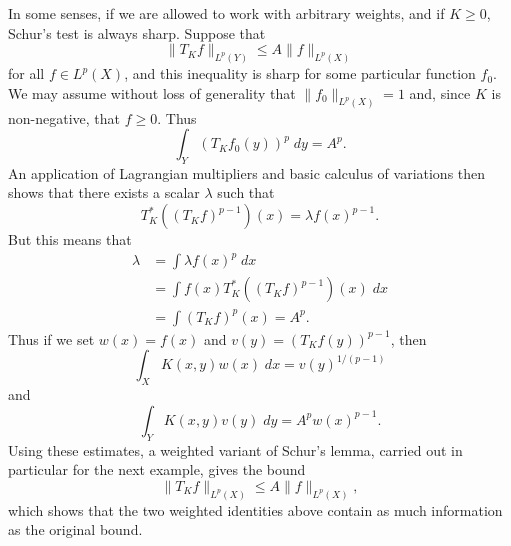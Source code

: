 In some senses, if we are allowed to work with arbitrary weights, and if $K \geq 0$, Schur's test is always sharp. Suppose that
%
\[ \| T_K f \|_{L^p(Y)} \leq A \| f \|_{L^p(X)} \]
%
for all $f \in L^p(X)$, and this inequality is sharp for some particular function $f_0$. We may assume without loss of generality that $\| f_0 \|_{L^p(X)} = 1$ and, since $K$ is non-negative, that $f \geq 0$. Thus
%
\[ \int_Y (T_K f_0(y))^p\; dy = A^p. \]
%
An application of Lagrangian multipliers and basic calculus of variations then shows that there exists a scalar $\lambda$ such that
%
\[ T_K^*((T_K f)^{p-1})(x) = \lambda f(x)^{p-1}. \]
%
But this means that
%
\begin{align*}
  \lambda &= \int \lambda f(x)^p\; dx\\
  &= \int f(x)T_K^*((T_K f)^{p-1})(x)\; dx\\
  &= \int (T_K f)^p(x) = A^p.
\end{align*}
%
Thus if we set $w(x) = f(x)$ and $v(y) = (T_K f(y))^{p-1}$, then
%
\[ \int_X K(x,y) w(x)\; dx = v(y)^{1/(p-1)} \]
%
and
%
\[ \int_Y K(x,y) v(y)\; dy = A^p w(x)^{p-1}. \]
%
Using these estimates, a weighted variant of Schur's lemma, carried out in particular for the next example, gives the bound
%
\[ \| T_K f \|_{L^p(X)} \leq A \| f \|_{L^p(X)}, \]
%
which shows that the two weighted identities above contain as much information as the original bound.

